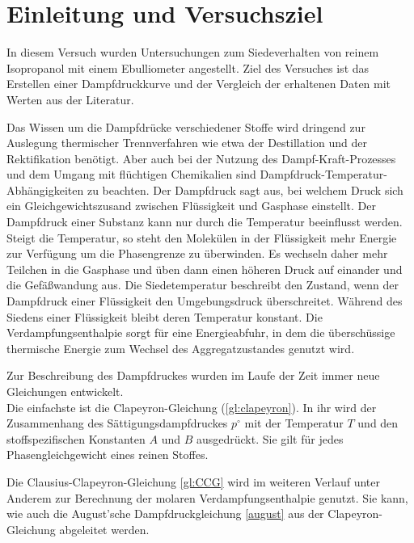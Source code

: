 \section{Einleitung und Versuchsziel}
\label{sec:aufgabenstellung}

In diesem Versuch wurden Untersuchungen zum Siedeverhalten von reinem Isopropanol mit einem Ebulliometer angestellt. Ziel des Versuches ist das Erstellen einer Dampfdruckkurve und der Vergleich der erhaltenen Daten mit Werten aus der Literatur.

Das Wissen um die Dampfdrücke verschiedener Stoffe wird dringend zur Auslegung thermischer Trennverfahren wie etwa der Destillation und der Rektifikation benötigt. Aber auch bei der Nutzung des Dampf-Kraft-Prozesses und dem Umgang mit flüchtigen Chemikalien sind Dampfdruck-Temperatur-Abhängigkeiten zu beachten.
Der Dampfdruck sagt aus, bei welchem Druck sich ein Gleichgewichtszusand zwischen Flüssigkeit und Gasphase einstellt. Der Dampfdruck einer Substanz kann nur durch die Temperatur beeinflusst werden. Steigt die Temperatur, so steht den Molekülen in der Flüssigkeit mehr Energie zur Verfügung um die Phasengrenze zu überwinden. Es wechseln daher mehr Teilchen in die Gasphase und üben dann einen höheren Druck auf einander und die Gefäßwandung aus. Die Siedetemperatur beschreibt den Zustand, wenn der Dampfdruck einer Flüssigkeit den Umgebungsdruck überschreitet. Während des Siedens einer Flüssigkeit bleibt deren Temperatur konstant. Die Verdampfungsenthalpie sorgt für eine Energieabfuhr, in dem die überschüssige thermische Energie zum Wechsel des Aggregatzustandes genutzt wird. 

Zur Beschreibung des Dampfdruckes wurden im Laufe der Zeit immer neue Gleichungen entwickelt.\\
Die einfachste ist die Clapeyron-Gleichung (\ref{gl:clapeyron}). In ihr wird der Zusammenhang des Sättigungsdampfdruckes $p^\circ$ mit der Temperatur $T$ und den stoffspezifischen Konstanten $A$ und $B$ ausgedrückt. Sie gilt für jedes Phasengleichgewicht eines reinen Stoffes.

Die Clausius-Clapeyron-Gleichung \eqref{gl:CCG} wird im weiteren Verlauf unter Anderem zur Berechnung der molaren Verdampfungsenthalpie genutzt. Sie kann, wie auch die August'sche Dampfdruckgleichung \eqref{august} aus der Clapeyron-Gleichung abgeleitet werden.

